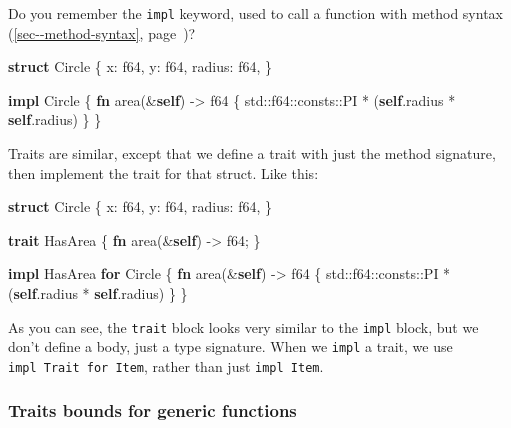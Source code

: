 \documentclass[a4paper,]{book}
\renewcommand*{\hyperref}[2][\ar]{%
  \def\ar{#2}%
  #2 (\autoref{#1}, page~\pageref{#1})}
\newenvironment{Shaded}{\begin{snugshade}}{\end{snugshade}}
\newcommand{\KeywordTok}[1]{\textcolor[rgb]{0.13,0.29,0.53}{\textbf{{#1}}}}
\newcommand{\DataTypeTok}[1]{\textcolor[rgb]{0.13,0.29,0.53}{{#1}}}
\newcommand{\NormalTok}[1]{{#1}}
\begin{document}
Do you remember the \texttt{impl} keyword, used to call a function with
\hyperref[sec--method-syntax]{method syntax}?

\begin{Shaded}
\begin{Highlighting}[]
\KeywordTok{struct} \NormalTok{Circle \{}
    \NormalTok{x: }\DataTypeTok{f64}\NormalTok{,}
    \NormalTok{y: }\DataTypeTok{f64}\NormalTok{,}
    \NormalTok{radius: }\DataTypeTok{f64}\NormalTok{,}
\NormalTok{\}}

\KeywordTok{impl} \NormalTok{Circle \{}
    \KeywordTok{fn} \NormalTok{area(&}\KeywordTok{self}\NormalTok{) -> }\DataTypeTok{f64} \NormalTok{\{}
        \NormalTok{std::}\DataTypeTok{f64}\NormalTok{::consts::PI * (}\KeywordTok{self}\NormalTok{.radius * }\KeywordTok{self}\NormalTok{.radius)}
    \NormalTok{\}}
\NormalTok{\}}
\end{Highlighting}
\end{Shaded}

Traits are similar, except that we define a trait with just the method
signature, then implement the trait for that struct. Like this:

\begin{Shaded}
\begin{Highlighting}[]
\KeywordTok{struct} \NormalTok{Circle \{}
    \NormalTok{x: }\DataTypeTok{f64}\NormalTok{,}
    \NormalTok{y: }\DataTypeTok{f64}\NormalTok{,}
    \NormalTok{radius: }\DataTypeTok{f64}\NormalTok{,}
\NormalTok{\}}

\KeywordTok{trait} \NormalTok{HasArea \{}
    \KeywordTok{fn} \NormalTok{area(&}\KeywordTok{self}\NormalTok{) -> }\DataTypeTok{f64}\NormalTok{;}
\NormalTok{\}}

\KeywordTok{impl} \NormalTok{HasArea }\KeywordTok{for} \NormalTok{Circle \{}
    \KeywordTok{fn} \NormalTok{area(&}\KeywordTok{self}\NormalTok{) -> }\DataTypeTok{f64} \NormalTok{\{}
        \NormalTok{std::}\DataTypeTok{f64}\NormalTok{::consts::PI * (}\KeywordTok{self}\NormalTok{.radius * }\KeywordTok{self}\NormalTok{.radius)}
    \NormalTok{\}}
\NormalTok{\}}
\end{Highlighting}
\end{Shaded}

As you can see, the \texttt{trait} block looks very similar to the
\texttt{impl} block, but we don't define a body, just a type signature.
When we \texttt{impl} a trait, we use \texttt{impl\ Trait\ for\ Item},
rather than just \texttt{impl\ Item}.

\subsubsection{Traits bounds for generic
functions}\label{traits-bounds-for-generic-functions}
\end{document}

